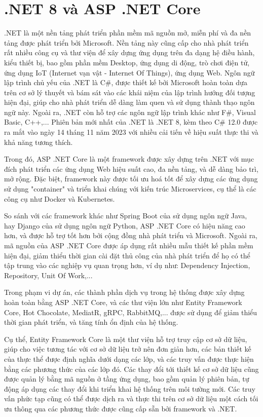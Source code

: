 \documentclass[../DoAn.tex]{subfiles}
\begin{document}
\section{.NET 8 và ASP .NET Core}
\label{section:3.3}

.NET là một nền tảng phát triển phần mềm mã nguồn mở, miễn phí và đa nền tảng được phát triển bởi Microsoft. Nền tảng này cũng cấp cho nhà phát triển
rất nhiều công cụ và thư viện để xây dựng ứng dụng trên đa dạng hệ điều hành, kiểu thiết bị, bao gồm phần mềm Desktop, ứng dụng di động, trò chơi điện tử,
ứng dụng IoT (Internet vạn vật - Internet Of Things), ứng dụng Web. Ngôn ngữ lập trình chủ yếu của .NET là C\#, được thiết kế bởi Microsoft hoàn toàn dựa trên
cơ sở lý thuyết và bám sát vào các khái niệm của lập trình hướng đối tượng hiện đại, giúp cho nhà phát triển dễ dàng làm quen và sử dụng thành thạo
ngôn ngữ này. Ngoài ra, .NET còn hỗ trợ các ngôn ngữ lập trình khác như F\#, Visual Basic, C++,... Phiên bản mới nhất của .NET là .NET 8, kèm theo
C\# 12.0 được ra mắt vào ngày 14 tháng 11 năm 2023 với nhiều cải tiến về hiệu suất thực thi và khả năng tương thích.

Trong đó, ASP .NET Core là một framework được xây dựng  trên .NET với mục đích phát triển các ứng dụng Web hiệu suất cao, đa nền tảng,
và dễ dàng bảo trì, mở rộng. Đặc biệt, framework này được tối ưu hoá tốt để xây dựng các ứng dụng sử dụng "container" và triển khai chúng với
kiến trúc Microservices, cụ thể là các công cụ như Docker và Kubernetes.

So sánh với các framework khác như Spring Boot của sử dụng ngôn ngữ Java, hay Django của sử dụng ngôn ngữ Python, ASP .NET Core có hiệu năng cao hơn,
và được hỗ trợ tốt hơn bởi cộng đồng nhà phát triển và Microsoft. Ngoài ra, mã nguồn của ASP .NET Core được áp dụng rất nhiều mẫu thiết kế phần mềm
hiện đại, giảm thiểu thời gian cài đặt thủ công của nhà phát triển để họ có thể tập trung vào các nghiệp vụ quan trọng hơn, ví dụ như:
Dependency Injection, Repository, Unit Of Work,...

Trong phạm vi dự án, các thành phần dịch vụ trong hệ thống được xây dựng hoàn toàn bằng ASP .NET Core, và các thư viện lớn như Entity Framework Core,
Hot Chocolate, MediatR, gRPC, RabbitMQ,... được sử dụng để giảm thiểu thời gian phát triển, và tăng tính ổn định của hệ thống.

Cụ thể, Entity Framework Core là một thư viện hỗ trợ truy cập cơ sở dữ liệu, giúp cho việc tương tác với cơ sở dữ liệu trở nên đơn giản hơn,
các bản thiết kế của thực thể được định nghĩa dưới dạng các lớp, và các truy vấn được thực hiện bằng các phương thức của các lớp đó. Các thay đổi
tới thiết kế cơ sở dữ liệu cũng được quản lý bằng mã nguồn ở tầng ứng dụng, bao gồm quản lý phiên bản, tự động áp dụng các thay đổi khi triển
khai hệ thống trên môi tường mới. Các truy vấn phức tạp cũng có thể được dịch ra và thực thi trên cơ sở dữ liệu một cách tối ưu thông qua các phương
thức được cũng cấp sẵn bởi framework và .NET.
\end{document}
